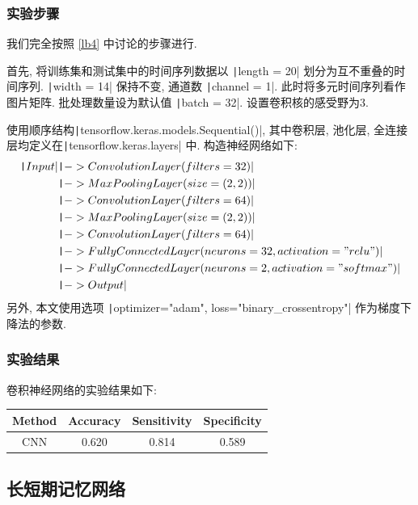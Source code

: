 \documentclass[12pt]{ctexart}
\begin{document}
\subsubsection{实验步骤} \label{lb6}
我们完全按照 \ref{lb4} 中讨论的步骤进行.

首先, 将训练集和测试集中的时间序列数据以 \texttt|length = 20| 划分为互不重叠的时间序列. \texttt|width = 14| 保持不变, 通道数 \texttt|channel = 1|. 此时将多元时间序列看作图片矩阵. 批处理数量设为默认值 \texttt|batch = 32|. 设置卷积核的感受野为3. 

使用顺序结构\texttt|tensorflow.keras.models.Sequential()|, 其中卷积层, 池化层, 全连接层均定义在\texttt|tensorflow.keras.layers| 中. 构造神经网络如下: 
\begin{align*}
\texttt|Input|&\texttt| -> ConvolutionLayer(filters=32)|\\
 &\texttt| -> MaxPoolingLayer(size=(2,2))|\\
 &\texttt| -> ConvolutionLayer(filters=64)|\\
 &\texttt| -> MaxPoolingLayer(size=(2,2))|\\
 &\texttt| -> ConvolutionLayer(filters=64)|\\
 &\texttt| -> FullyConnectedLayer(neurons=32, activation="relu")|\\
 &\texttt| -> FullyConnectedLayer(neurons=2, activation="softmax")|\\
 &\texttt| -> Output|\\
\end{align*}
另外, 本文使用选项 \texttt|optimizer="adam", loss="binary_crossentropy"| 作为梯度下降法的参数. 

\subsubsection{实验结果}
卷积神经网络的实验结果如下:
\begin{table}[!htbp]
\centering
\begin{tabular}{|c|c|c|c|}
\hline
Method&Accuracy&Sensitivity&Specificity\\
\hline
CNN&0.620& 0.814& 0.589\\
\hline
\end{tabular}
\end{table}

\subsection{长短期记忆网络}
\end{document}
